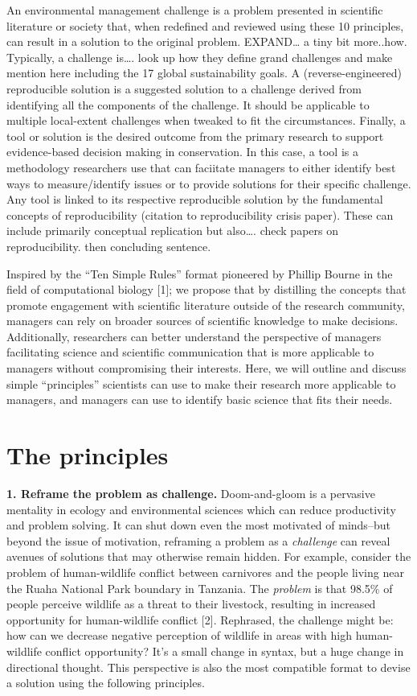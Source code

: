 \documentclass[10pt,letterpaper]{article}
\begin{document}
An environmental management challenge is a problem presented in
scientific literature or society that, when redefined and reviewed using
these 10 principles, can result in a solution to the original problem.
EXPAND\ldots{} a tiny bit more..how. Typically, a challenge is\ldots{}.
look up how they define grand challenges and make mention here including
the 17 global sustainability goals. A (reverse-engineered) reproducible
solution is a suggested solution to a challenge derived from identifying
all the components of the challenge. It should be applicable to multiple
local-extent challenges when tweaked to fit the circumstances. Finally,
a tool or solution is the desired outcome from the primary research to
support evidence-based decision making in conservation. In this case, a
tool is a methodology researchers use that can faciitate managers to
either identify best ways to measure/identify issues or to provide
solutions for their specific challenge. Any tool is linked to its
respective reproducible solution by the fundamental concepts of
reproducibility (citation to reproducibility crisis paper). These can
include primarily conceptual replication but also\ldots{}. check papers
on reproducibility. then concluding sentence.

Inspired by the ``Ten Simple Rules'' format pioneered by Phillip Bourne
in the field of computational biology {[}1{]}; we propose that by
distilling the concepts that promote engagement with scientific
literature outside of the research community, managers can rely on
broader sources of scientific knowledge to make decisions. Additionally,
researchers can better understand the perspective of managers
facilitating science and scientific communication that is more
applicable to managers without compromising their interests. Here, we
will outline and discuss simple ``principles'' scientists can use to
make their research more applicable to managers, and managers can use to
identify basic science that fits their needs.

\section{The principles}\label{the-principles}

\textbf{1. Reframe the problem as challenge.} Doom-and-gloom is a
pervasive mentality in ecology and environmental sciences which can
reduce productivity and problem solving. It can shut down even the most
motivated of minds--but beyond the issue of motivation, reframing a
problem as a \emph{challenge} can reveal avenues of solutions that may
otherwise remain hidden. For example, consider the problem of
human-wildlife conflict between carnivores and the people living near
the Ruaha National Park boundary in Tanzania. The \emph{problem} is that
98.5\% of people perceive wildlife as a threat to their livestock,
resulting in increased opportunity for human-wildlife conflict {[}2{]}.
Rephrased, the challenge might be: how can we decrease negative
perception of wildlife in areas with high human-wildlife conflict
opportunity? It's a small change in syntax, but a huge change in
directional thought. This perspective is also the most compatible format
to devise a solution using the following principles.
\end{document}
